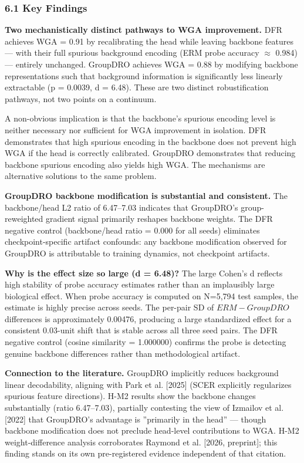 
\subsubsection{6.1 Key Findings}

\textbf{Two mechanistically distinct pathways to WGA improvement.} DFR achieves WGA = 0.91 by recalibrating the head while leaving backbone features --- with their full spurious background encoding (ERM probe accuracy $\approx$ 0.984) --- entirely unchanged. GroupDRO achieves WGA = 0.88 by modifying backbone representations such that background information is significantly less linearly extractable (p = 0.0039, d = 6.48). These are two distinct robustification pathways, not two points on a continuum.

A non-obvious implication is that the backbone's spurious encoding level is neither necessary nor sufficient for WGA improvement in isolation. DFR demonstrates that high spurious encoding in the backbone does not prevent high WGA if the head is correctly calibrated. GroupDRO demonstrates that reducing backbone spurious encoding also yields high WGA. The mechanisms are alternative solutions to the same problem.

\textbf{GroupDRO backbone modification is substantial and consistent.} The backbone/head L2 ratio of 6.47--7.03 indicates that GroupDRO's group-reweighted gradient signal primarily reshapes backbone weights. The DFR negative control (backbone/head ratio = 0.000 for all seeds) eliminates checkpoint-specific artifact confounds: any backbone modification observed for GroupDRO is attributable to training dynamics, not checkpoint artifacts.

\textbf{Why is the effect size so large (d = 6.48)?} The large Cohen's d reflects high stability of probe accuracy estimates rather than an implausibly large biological effect. When probe accuracy is computed on N=5,794 test samples, the estimate is highly precise across seeds. The per-pair SD of $ERM-GroupDRO$ differences is approximately 0.00476, producing a large standardized effect for a consistent 0.03-unit shift that is stable across all three seed pairs. The DFR negative control (cosine similarity = 1.000000) confirms the probe is detecting genuine backbone differences rather than methodological artifact.

\textbf{Connection to the literature.} GroupDRO implicitly reduces background linear decodability, aligning with Park et al. [2025] (SCER explicitly regularizes spurious feature directions). H-M2 results show the backbone changes substantially (ratio 6.47--7.03), partially contesting the view of Izmailov et al. [2022] that GroupDRO's advantage is ''primarily in the head'' --- though backbone modification does not preclude head-level contributions to WGA. H-M2 weight-difference analysis corroborates Raymond et al. [2026, preprint]; this finding stands on its own pre-registered evidence independent of that citation.

